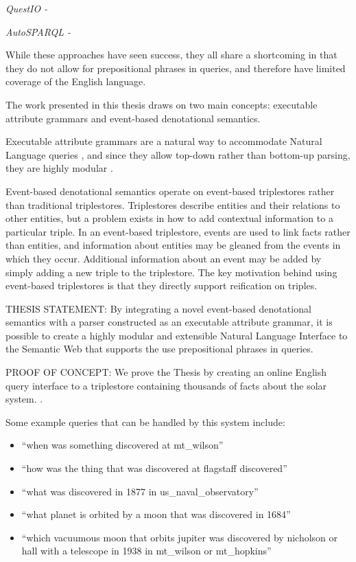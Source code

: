 \documentclass[../main.tex]{subfiles}
\begin{document}

{\em QuestIO - }

{\em AutoSPARQL - }


While these approaches have seen success, they all share a shortcoming in that they do not allow for prepositional phrases in queries, and therefore have limited coverage of the English language.


The work presented in this thesis draws on two main concepts: executable attribute grammars\cite{frosthafiz2008} and event-based denotational semantics\cite{frostagbola2014}.

Executable attribute grammars are a natural way to accommodate Natural Language queries \cite{?}, and since they allow top-down rather than bottom-up parsing, they are highly modular \cite{frosthafiz2008}.

Event-based denotational semantics operate on event-based triplestores\cite{frost2014demonstration} rather than traditional triplestores.  Triplestores describe entities and their relations to other entities, but a problem exists in how to add contextual information to a particular triple.  In an event-based triplestore, events are used to link facts rather than entities, and information about entities may be gleaned from the events in which they occur.  Additional information about an event may be added by simply adding a new triple to the triplestore.  The key motivation behind using event-based triplestores is that they directly support reification on triples\cite{?}.

THESIS STATEMENT: By integrating a novel event-based denotational semantics with a parser constructed as an executable attribute grammar, it is possible to create a highly modular and extensible Natural Language Interface to the Semantic Web that supports the use prepositional phrases in queries.

PROOF OF CONCEPT: We prove the Thesis by creating an online English query interface to a triplestore containing thousands of facts about the solar system. \cite{Solarman:2016}.

Some example queries that can be handled by this system include:

\begin{itemize}
	\item ``when was something discovered at mt\_wilson''
	\item ``how was the thing that was discovered at flagstaff discovered''
	\item ``what was discovered in 1877 in us\_naval\_observatory''
	\item ``what planet is orbited by a moon that was discovered in 1684''
	\item ``which vacuumous moon that orbits jupiter was discovered by nicholson or hall with a telescope in 1938 in mt\_wilson or mt\_hopkins''
\end{itemize}
\end{document}

